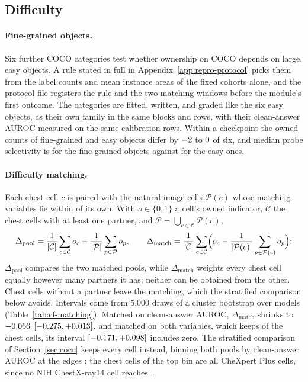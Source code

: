 \documentclass{article}
\begin{document}
\subsection{Difficulty}
\label{app:cf-difficulty}

\paragraph{Fine-grained objects.} Six further COCO categories test whether ownership on COCO depends on large, easy objects. A rule stated in full in Appendix~\ref{app:repro-protocol} picks them from the label counts and mean instance areas of the fixed cohorts alone, and the protocol file registers the rule and the two matching windows before the module's first outcome. The categories are fitted, written, and graded like the six easy objects, as their own family in the same blocks and rows, with their clean-answer AUROC measured on the same calibration rows. Within a checkpoint the owned counts of fine-grained and easy objects differ by $-2$ to $0$ of six, and median probe selectivity is \cfFgFineSel{} for the fine-grained objects against \cfFgEasySameSel{} for the easy ones.

\paragraph{Difficulty matching.} Each chest cell $c$ is paired with the natural-image cells $\mathcal P(c)$ whose matching variables lie within \cfFgWindow{} of its own. With $o\in\{0,1\}$ a cell's owned indicator, $\mathcal C$ the chest cells with at least one partner, and $\mathcal P=\bigcup_{c\in\mathcal C}\mathcal P(c)$,
\begin{equation}
\Delta_{\text{pool}}=\frac{1}{|\mathcal C|}\sum_{c\in\mathcal C}o_c-\frac{1}{|\mathcal P|}\sum_{p\in\mathcal P}o_p,\qquad
\Delta_{\text{match}}=\frac{1}{|\mathcal C|}\sum_{c\in\mathcal C}\Bigl(o_c-\frac{1}{|\mathcal P(c)|}\sum_{p\in\mathcal P(c)}o_p\Bigr);
\label{eq:matching}
\end{equation}
$\Delta_{\text{pool}}$ compares the two matched pools, while $\Delta_{\text{match}}$ weights every chest cell equally however many partners it has; neither can be obtained from the other. Chest cells without a partner leave the matching, which the stratified comparison below avoids. Intervals come from 5{,}000 draws of a cluster bootstrap over models (Table~\ref{tab:cf-matching}). Matched on clean-answer AUROC, $\Delta_{\text{match}}$ shrinks to $-0.066$ $[-0.275,+0.013]$, and matched on both variables, which keeps \cfFgMatchBothN{} of the \cfFgMatchBothCells{} chest cells, its interval $[-0.171,+0.098]$ includes zero. The stratified comparison of Section~\ref{sec:coco} keeps every cell instead, binning both pools by clean-answer AUROC at the edges \cfStratEdges{}; the \cfStratChestTopN{} chest cells of the top bin are all CheXpert Plus cells, since no NIH ChestX-ray14 cell reaches \cfStratTopEdge{}.
\end{document}
